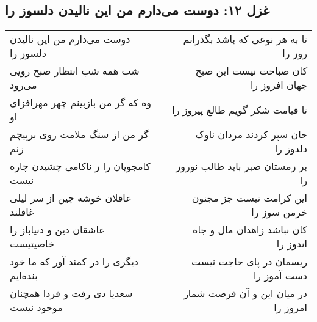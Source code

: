 \begin{center}
\section*{غزل ۱۲: دوست می‌دارم من این نالیدن دلسوز را}
\label{sec:012}
\begin{longtable}{l p{0.5cm} r}
دوست می‌دارم من این نالیدن دلسوز را
&&
تا به هر نوعی که باشد بگذرانم روز را
\\
شب همه شب انتظار صبح رویی می‌رود
&&
کان صباحت نیست این صبح جهان افروز را
\\
وه که گر من بازبینم چهر مهرافزای او
&&
تا قیامت شکر گویم طالع پیروز را
\\
گر من از سنگ ملامت روی برپیچم زنم
&&
جان سپر کردند مردان ناوک دلدوز را
\\
کامجویان را ز ناکامی چشیدن چاره نیست
&&
بر زمستان صبر باید طالب نوروز را
\\
عاقلان خوشه چین از سر لیلی غافلند
&&
این کرامت نیست جز مجنون خرمن سوز را
\\
عاشقان دین و دنیاباز را خاصیتیست
&&
کان نباشد زاهدان مال و جاه اندوز را
\\
دیگری را در کمند آور که ما خود بنده‌ایم
&&
ریسمان در پای حاجت نیست دست آموز را
\\
سعدیا دی رفت و فردا همچنان موجود نیست
&&
در میان این و آن فرصت شمار امروز را
\\
\end{longtable}
\end{center}
